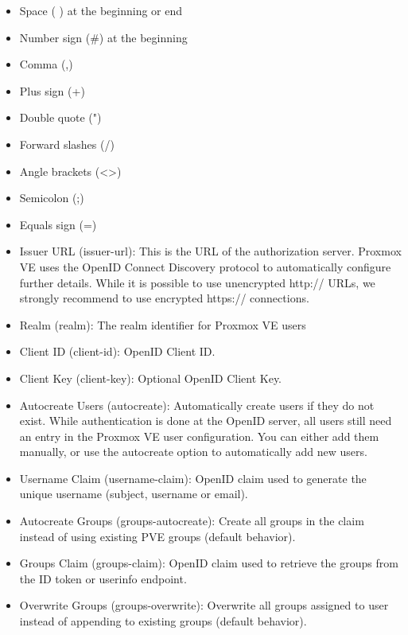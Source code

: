 \begin{itemize}[leftmargin=2cm]

	\item Space ( ) at the beginning or end

	\item Number sign (#) at the beginning

	\item Comma (,)

	\item Plus sign (+)

	\item Double quote (")

	\item Forward slashes (/)

	\item Angle brackets (<>)

	\item Semicolon (;)

	\item Equals sign (=)

\end{itemize}

\begin{itemize}[leftmargin=2cm]

	\item Issuer URL (issuer-url): This is the URL of the authorization server. Proxmox VE uses the OpenID Connect Discovery protocol to automatically configure further details. While it is possible to use unencrypted http:// URLs, we strongly recommend to use encrypted https:// connections.

	\item Realm (realm): The realm identifier for Proxmox VE users

	\item Client ID (client-id): OpenID Client ID.

	\item Client Key (client-key): Optional OpenID Client Key.

	\item Autocreate Users (autocreate): Automatically create users if they do not exist. While authentication is done at the OpenID server, all users still need an entry in the Proxmox VE user configuration. You can either add them manually, or use the autocreate option to automatically add new users.

	\item Username Claim (username-claim): OpenID claim used to generate the unique username (subject, username or email).

	\item Autocreate Groups (groups-autocreate): Create all groups in the claim instead of using existing PVE groups (default behavior).

	\item Groups Claim (groups-claim): OpenID claim used to retrieve the groups from the ID token or userinfo endpoint.

	\item Overwrite Groups (groups-overwrite): Overwrite all groups assigned to user instead of appending to existing groups (default behavior).

\end{itemize}

